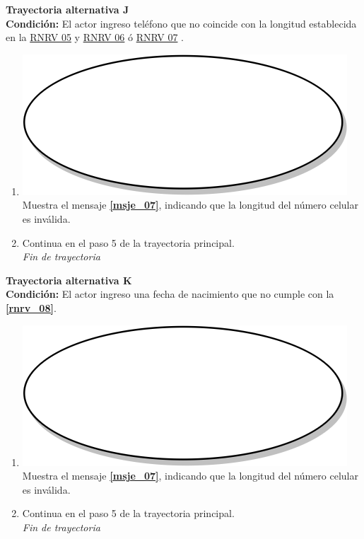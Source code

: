 \textbf{Trayectoria alternativa J} \label{cu2_ta_j}\\
\textbf{Condición:} El actor ingreso teléfono que no coincide con la longitud establecida en la \hyperref[rnrv_05]{RNRV 05} y \hyperref[rnrv_06]{RNRV 06} ó \hyperref[rnrv_07]{RNRV 07} .\\
 \begin{enumerate}[label=J\arabic*]
    \item {\includegraphics[scale=.05]{Capitulo3/img/proceso.png} Muestra el mensaje \textbf{\ref{msje_07}}, indicando que la longitud del número celular es inválida.}
    \item {Continua en el paso 5 de la trayectoria principal.} \\
    \textit{Fin de trayectoria} \\
\end{enumerate}

\textbf{Trayectoria alternativa K} \label{cu2_ta_k}\\
\textbf{Condición:} El actor ingreso una fecha de nacimiento que no cumple con la \textbf{\ref{rnrv_08}}.\\
 \begin{enumerate}[label=K\arabic*]
    \item {\includegraphics[scale=.05]{Capitulo3/img/proceso.png} Muestra el mensaje \textbf{\ref{msje_07}}, indicando que la longitud del número celular es inválida.}
    \item {Continua en el paso 5 de la trayectoria principal.} \\
    \textit{Fin de trayectoria} \\
\end{enumerate}

